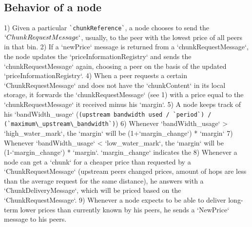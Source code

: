 \subsection{Behavior of a node \statusred}
1) Given a particular \lstinline{`chunkReference`}, a node chooses to send the $`ChunkRequestMessage`$, usually, to the peer with the lowest price of all peers in that bin.
2) If a `newPrice` message is returned from a `chunkRequestMessage`, the node updates the `priceInformationRegistry` and sends the `chunkRequestMessage` again, choosing a peer on the basis of the updated `priceInformationRegistry`. 
4) When a peer requests a certain `ChunkRequestMessage` and does not have the `chunkContent` in its local storage, it forwards the `chunkRequestMessage` (see 1) with a price equal to the `chunkRequestMessage` it received minus his `margin`.
5) A node keeps track of his `bandWidth\_usage` (\lstinline{(upstream bandwidth used / `period`) / (`maximum\_upstream\_bandwidth`)})
6) Whenever `bandWidth\_usage` > `high\_water\_mark`, the `margin` will be (1+`margin\_change`) * `margin`
7) Whenever `bandWidth\_usage` < `low\_water\_mark`, the `margin` will be (1-`margin\_change`) * `margin`. `margin\_change` indicates the 
8) Whenever a node can get a `chunk` for a cheaper price than requested by a `ChunkRequestMessage` (upstream peers changed prices, amount of hops are less than the average request for the same distance), he answers with a `ChunkDeliveryMessage`, which will be priced based on the `ChunkRequestMessage`. 
9) Whenever a node expects to be able to deliver long-term lower prices than currently known by his peers, he sends a `NewPrice` message to his peers. 
